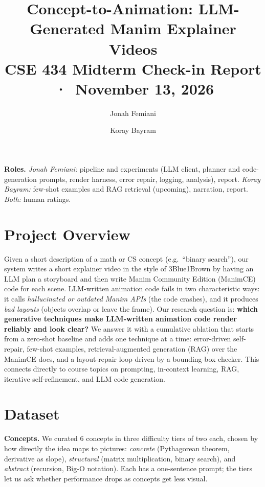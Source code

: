 \documentclass[11pt]{article}
\title{\vspace{-3em}Concept-to-Animation: LLM-Generated Manim Explainer Videos\\[0.2em]
\large CSE 434 Midterm Check-in Report \,·\, November 13, 2026}
\author{Jonah Femiani \and Koray Bayram}
\date{\vspace{-2.2em}}
\begin{document}
\maketitle
\vspace{-1.2em}
\begin{center}
\begin{minipage}{0.88\textwidth}
\small
\textbf{Roles.} \emph{Jonah Femiani:} pipeline and experiments (LLM client, planner and code-generation prompts, render harness, error repair, logging, analysis), report. \emph{Koray Bayram:} few-shot examples and RAG retrieval (upcoming), narration, report. \emph{Both:} human ratings.
\end{minipage}
\end{center}
\vspace{-0.3em}

\section{Project Overview}

Given a short description of a math or CS concept (e.g.\ ``binary search''), our system writes a short explainer video in the style of 3Blue1Brown by having an LLM plan a storyboard and then write Manim Community Edition (ManimCE) code for each scene.
LLM-written animation code fails in two characteristic ways: it calls \emph{hallucinated or outdated Manim APIs} (the code crashes), and it produces \emph{bad layouts} (objects overlap or leave the frame).
Our research question is: \textbf{which generative techniques make LLM-written animation code render reliably and look clear?}
We answer it with a cumulative ablation that starts from a zero-shot baseline and adds one technique at a time: error-driven self-repair, few-shot examples, retrieval-augmented generation (RAG) over the ManimCE docs, and a layout-repair loop driven by a bounding-box checker.
This connects directly to course topics on prompting, in-context learning, RAG, iterative self-refinement, and LLM code generation.

\section{Dataset}

\textbf{Concepts.} We curated 6 concepts in three difficulty tiers of two each, chosen by how directly the idea maps to pictures:
\emph{concrete} (Pythagorean theorem, derivative as slope),
\emph{structural} (matrix multiplication, binary search), and
\emph{abstract} (recursion, Big-O notation).
Each has a one-sentence prompt; the tiers let us ask whether performance drops as concepts get less visual.
\end{document}
